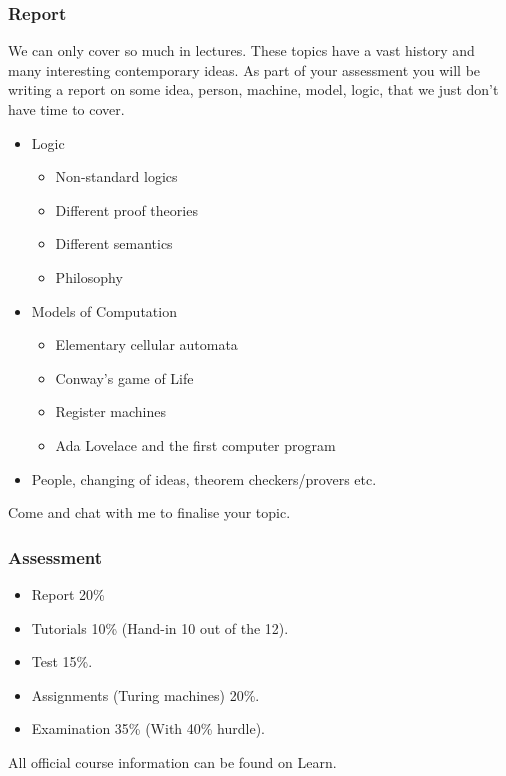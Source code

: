 \documentclass{beamer}
\theoremstyle{indentDefn} \newtheorem{defn}[]{Definition}
\begin{document}
\begin{frame}
	\frametitle{Report}
	
	We can only cover so much in lectures. These topics have a vast history and many interesting contemporary ideas. As part of your assessment you will be writing a report on some idea, person, machine, model, logic, that we just don't have time to cover. 
	
	\vspace{0.1cm} 
	
	\begin{itemize}
		\item Logic 
				\begin{itemize}
					\item Non-standard logics 
					\item Different proof theories 
					\item Different semantics
					\item Philosophy
				\end{itemize}
		\item Models of Computation
				\begin{itemize}
					\item Elementary cellular automata
					\item Conway's game of Life 
					\item Register machines
					\item Ada Lovelace and the first computer program
				\end{itemize}
		\item People, changing of ideas, theorem checkers/provers etc.  
		
	\end{itemize}

	Come and chat with me to finalise your topic. 
	
	
\end{frame}

\begin{frame}
	\frametitle{Assessment}
	
	\begin{itemize}
		\item Report 20\%
		\item Tutorials 10\% (Hand-in 10 out of the 12).
		\item Test 15\%.
		\item Assignments (Turing machines) 20\%.
		\item Examination 35\% (With 40\% hurdle).
	\end{itemize}
	
	\vspace{0.2cm}
	
	All official course information can be found on Learn.
	
\end{frame}
\end{document}

